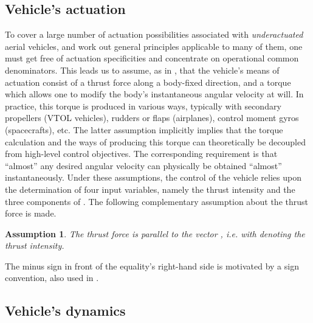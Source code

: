 \documentclass[twocolumn]{autart}
\newtheorem{hypothesis}{Assumption}
\theoremstyle{definition}
\theoremstyle{definition}
\begin{document}
\subsection{Vehicle's actuation}
\label{sec:actuation}
To cover a large number of actuation possibilities associated with {\em underactuated} aerial vehicles, and work out general principles applicable to many of
them, one must get free of actuation specificities and concentrate on operational common denominators. This leads us to assume, as in \cite{2009_HUA}, that the vehicle's means of actuation
consist of a thrust force  along a body-fixed direction, and a torque  which allows one to modify the body's instantaneous angular velocity  at will. In practice, this torque is produced in various ways, typically with secondary propellers (VTOL vehicles), rudders or flaps (airplanes), control moment gyros (spacecrafts), etc. The latter assumption implicitly implies that the torque calculation and the ways of producing this torque can theoretically be decoupled from high-level control objectives. The corresponding requirement is that ``almost'' any desired angular velocity can physically be obtained ``almost'' instantaneously. Under these assumptions, the control of the vehicle relies upon the determination of four input variables, namely the thrust intensity and the three components of . The following complementary assumption about the thrust force is made.

\begin{hypothesis}
\label{hy:actuation}
The thrust force  is parallel to the vector , i.e.  with  denoting the thrust intensity.
\end{hypothesis}
The minus sign in front of the equality's right-hand side is motivated by a sign convention, also used in \cite{2009_HUA}.

\subsection{Vehicle's dynamics}
\label{subsec:systemmodeling}
\end{document}
